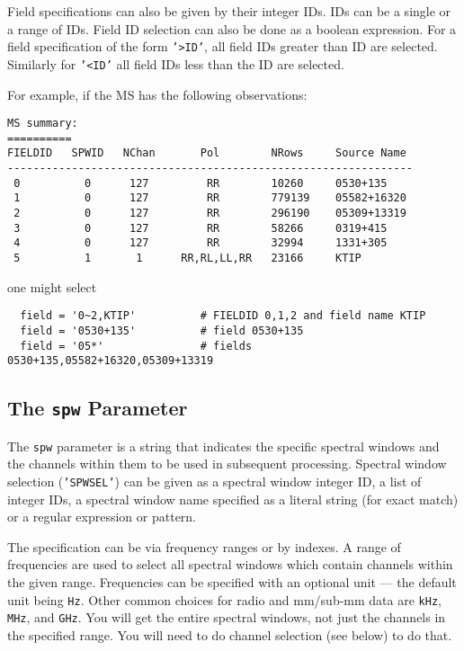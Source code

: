 Field specifications can also be given by their integer IDs.  IDs can
be a single or a range of IDs.  Field ID selection can also be done as
a boolean expression.  For a field specification of the form {\tt '>ID'},
all field IDs greater than ID are selected.  Similarly for {\tt '<ID'} all
field IDs less than the ID are selected.

For example, if the MS has the following observations:
\small
\begin{verbatim}
MS summary:
==========
FIELDID   SPWID   NChan       Pol        NRows     Source Name
---------------------------------------------------------------
 0          0      127         RR        10260     0530+135
 1          0      127         RR        779139    05582+16320
 2          0      127         RR        296190    05309+13319
 3          0      127         RR        58266     0319+415
 4          0      127         RR        32994     1331+305
 5          1       1      RR,RL,LL,RR   23166     KTIP
\end{verbatim}
\normalsize
one might select
\small
\begin{verbatim}
  field = '0~2,KTIP'          # FIELDID 0,1,2 and field name KTIP
  field = '0530+135'          # field 0530+135
  field = '05*'               # fields 0530+135,05582+16320,05309+13319
\end{verbatim}
\normalsize

\subsection{The {\tt spw} Parameter}
\label{section:io.selection.spw}

The {\tt spw} parameter is a string that indicates the specific
spectral windows and the channels within them to be used in subsequent
processing. Spectral window selection ({\tt 'SPWSEL'}) can be given as
a spectral window integer ID, a list of integer IDs, a spectral window
name specified as a literal string (for exact match) or a regular
expression or pattern. 

The specification can be via frequency ranges or by indexes.  
A range of frequencies are
used to select all spectral windows which contain channels within the
given range. Frequencies can be specified with an optional unit ---
the default unit being {\tt Hz}.  Other common choices for radio and
mm/sub-mm data are {\tt kHz}, {\tt MHz}, and {\tt GHz}.  You will get
the entire spectral windows, not just the channels in the specified
range.  You will need to do channel selection (see below) to do that.

